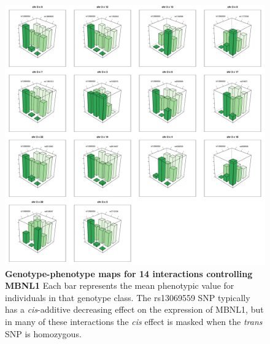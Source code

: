 \documentclass{article}
\begin{document}
\begin{figure}
	\includegraphics[width=5in]{MBNL1.pdf}
	\caption{\textbf{Genotype-phenotype maps for 14 interactions controlling MBNL1} Each bar represents the mean phenotypic value for individuals in that genotype class. The rs13069559 SNP typically has a \emph{cis}-additive decreasing effect on the expression of MBNL1, but in many of these interactions the \emph{cis} effect is masked when the \emph{trans} SNP is homozygous.}
	\label{fig:mbnl13d}
\end{figure}
\clearpage
\end{document}
